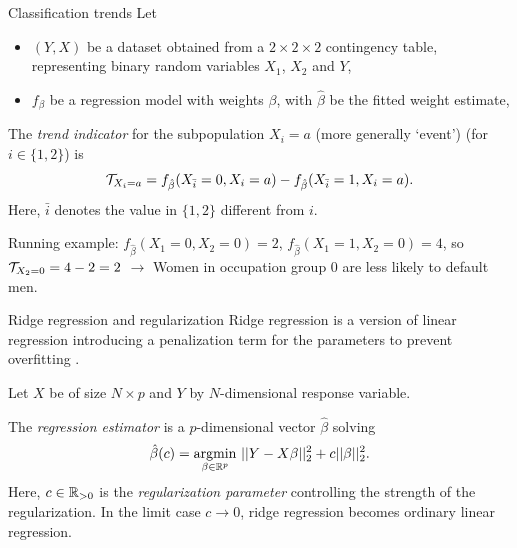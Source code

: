\begin{frame}{Classification trends}
  Let
\begin{itemize}
  \item $(Y,X)$ be a dataset obtained from a $2\times 2\times 2$ contingency table, representing binary random variables $X_1$, $X_2$ and $Y$,
  \item $f_{\beta}$ be a regression model with weights $\beta$, with $\hat{\beta}$ be the fitted weight estimate,
\end{itemize}



\begin{definition}
    The \emph{trend indicator} for the subpopulation $X_i = a$ (more generally `event') (for $i\in\{1,2\}$) is
    \begin{equation}
        \label{equ:trendIndicator}
        \mathcal{T}_{X_i=a} = f_{\hat{\beta}}(X_{\bar{i}} = 0, X_i = a) - f_{\hat{\beta}}(X_{\bar{i}} = 1, X_i = a).
    \end{equation}
    Here, $\bar{i}$ denotes the value in $\{1,2\}$ different from $i$.
\end{definition}
\vspace{0.5cm}

Running example: $f_{\hat{\beta}}(X_1=0, X_2 = 0) = 2$, $f_{\hat{\beta}}(X_1=1, X_2=0) = 4$, so $\mathcal{T}_{X_2=0} = 4 - 2 = 2$ \newline
$\rightarrow$ Women in occupation group 0 are less likely to default men.

\end{frame}

\begin{frame}{Ridge regression and regularization}
  Ridge regression is a version of linear regression introducing a penalization term for the parameters to prevent overfitting \cite[\S 3.4.1]{hastie2009elements}.

  Let $X$ be of size $N\times p$ and $Y$ by $N$-dimensional response variable.

  The \emph{regression estimator} is a $p$-dimensional vector $\hat{\beta}$ solving
\begin{equation*}
    \label{equ:optimizationRR}
    \hat{\beta}(c) = \underset{\beta\in\mathbb{R}^p}{\operatorname{argmin}}~ ||Y - X\beta||^2_2 + c||\beta||^2_2.
\end{equation*}
Here, $c\in\mathbb{R}_{>0}$ is the \emph{regularization parameter} controlling the strength of the regularization. In the limit case $c\rightarrow 0$, ridge regression becomes ordinary linear regression.
\end{frame}

